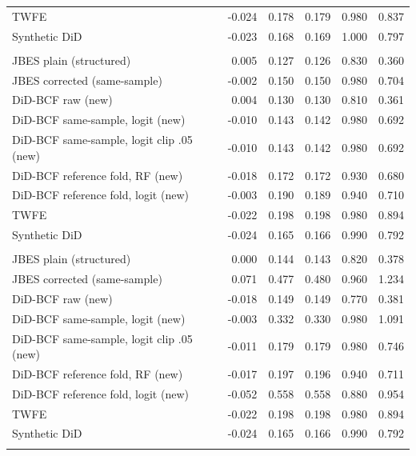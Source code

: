{\begin{longtable}{lrrrrr}
\quad TWFE & -0.024 & 0.178 & 0.179 & 0.980 & 0.837 \\
\quad Synthetic DiD & -0.023 & 0.168 & 0.169 & 1.000 & 0.797 \\
\addlinespace
\multicolumn{6}{l}{\textit{serial, $N=200$, degree $d=1$}} \\
\quad JBES plain (structured) & 0.005 & 0.127 & 0.126 & 0.830 & 0.360 \\
\quad JBES corrected (same-sample) & -0.002 & 0.150 & 0.150 & 0.980 & 0.704 \\
\quad DiD-BCF raw (new) & 0.004 & 0.130 & 0.130 & 0.810 & 0.361 \\
\quad DiD-BCF same-sample, logit (new) & -0.010 & 0.143 & 0.142 & 0.980 & 0.692 \\
\quad DiD-BCF same-sample, logit clip .05 (new) & -0.010 & 0.143 & 0.142 & 0.980 & 0.692 \\
\quad DiD-BCF reference fold, RF (new) & -0.018 & 0.172 & 0.172 & 0.930 & 0.680 \\
\quad DiD-BCF reference fold, logit (new) & -0.003 & 0.190 & 0.189 & 0.940 & 0.710 \\
\quad TWFE & -0.022 & 0.198 & 0.198 & 0.980 & 0.894 \\
\quad Synthetic DiD & -0.024 & 0.165 & 0.166 & 0.990 & 0.792 \\
\addlinespace
\multicolumn{6}{l}{\textit{serial, $N=200$, degree $d=2$}} \\
\quad JBES plain (structured) & 0.000 & 0.144 & 0.143 & 0.820 & 0.378 \\
\quad JBES corrected (same-sample) & 0.071 & 0.477 & 0.480 & 0.960 & 1.234 \\
\quad DiD-BCF raw (new) & -0.018 & 0.149 & 0.149 & 0.770 & 0.381 \\
\quad DiD-BCF same-sample, logit (new) & -0.003 & 0.332 & 0.330 & 0.980 & 1.091 \\
\quad DiD-BCF same-sample, logit clip .05 (new) & -0.011 & 0.179 & 0.179 & 0.980 & 0.746 \\
\quad DiD-BCF reference fold, RF (new) & -0.017 & 0.197 & 0.196 & 0.940 & 0.711 \\
\quad DiD-BCF reference fold, logit (new) & -0.052 & 0.558 & 0.558 & 0.880 & 0.954 \\
\quad TWFE & -0.022 & 0.198 & 0.198 & 0.980 & 0.894 \\
\quad Synthetic DiD & -0.024 & 0.165 & 0.166 & 0.990 & 0.792 \\
\addlinespace
\end{longtable}
}
